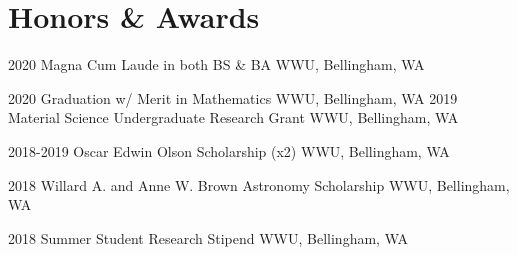 \documentclass[]{scoggins-cv} %
\begin{document}


\section{Honors \& Awards}

\begin{entrylist}

    \entry
    {2020}
    {Magna Cum Laude in both BS \& BA}
    {WWU, Bellingham, WA}
    {%
        \vspace*{-1.1em}
    }

    \entry
    {2020}
    {Graduation w/ Merit in Mathematics}
    {WWU, Bellingham, WA}
    {%
        \vspace*{-1.1em}
    }
    \entry
    {2019}
    {Material Science Undergraduate Research Grant}
    {WWU, Bellingham, WA}
    {%
        \vspace*{-1.1em}
    }

    \entry
    {2018-2019}
    {Oscar Edwin Olson Scholarship (x2)} %
    {WWU, Bellingham, WA}
    {%
        \vspace*{-1.1em}
    }

    \entry
    {2018}
    {Willard A. and Anne W. Brown Astronomy Scholarship} %
    {WWU, Bellingham, WA}
    {%
        \vspace*{-1.1em}
    }

    \entry
    {2018}
    {Summer Student Research Stipend} %
    {WWU, Bellingham, WA}
    {%
        \vspace*{-1.1em}
    }

\end{entrylist}


\end{document}
